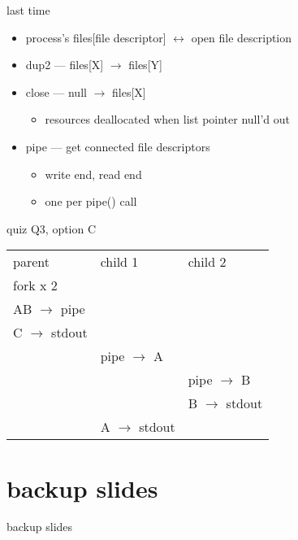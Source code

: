 \date{}
\title{}
\date{}

\begin{frame}
    \titlepage
\end{frame}



\begin{frame}{last time}
    \begin{itemize}
    \item process's files[file descriptor] $\leftrightarrow$ open file description
    \item dup2 --- files[X] $\rightarrow$ files[Y]
    \item close --- null $\rightarrow$ files[X]
        \begin{itemize}
        \item resources deallocated when list pointer null'd out
        \end{itemize}
    \item pipe --- get connected file descriptors
        \begin{itemize}
        \item write end, read end
        \item one per pipe() call
        \end{itemize}
    \end{itemize}
\end{frame}

\begin{frame}{quiz Q3, option C}
\begin{tabular}{l|l|l}
parent & child 1 & child 2 \\
fork x 2\\
AB $\rightarrow$ pipe \\
C $\rightarrow$ stdout \\
~ & pipe $\rightarrow$ A \\
~ & ~ & pipe $\rightarrow$ B \\
~ & ~ & B $\rightarrow$ stdout \\
~ & A $\rightarrow$ stdout \\
\end{tabular}
\end{frame}




\section{backup slides}
\begin{frame}{backup slides}
\end{frame}


